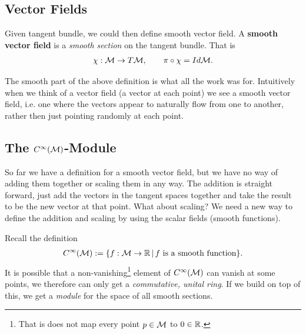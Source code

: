 \documentclass[12pt]{article} %
\begin{document}
\subsection{Vector Fields}
Given tangent bundle, we could then define smooth vector field.
    A \textbf{smooth vector field} is a \textit{smooth section} on the tangent bundle. That is 
    \begin{align*}
        \chi : \mathcal{M}\to T\mathcal{M}, \qquad \pi\circ \chi = Id{\mathcal{M}}.
    \end{align*}
\ed 
\begin{rema}
The smooth part of the above definition is what all the work was for. Intuitively when we think of a vector field (a vector at each point) we see a smooth vector field, i.e. one where the vectors appear to naturally flow from one to another, rather then just pointing randomly at each point.
\end{rema}
\subsection{The $C^{\infty}(\mathcal{M})$-Module}
So far we have a definition for a smooth vector field, but we have no way of adding them together or scaling them in any way. The addition is straight forward, just add the vectors in the tangent spaces together and take the result to be the new vector at that point. What about scaling? We need a new way to define the addition and scaling by using the scalar fields (smooth functions).

 Recall the definition
\begin{align*}
    C^{\infty}(\mathcal{M}) := \{f:\mathcal{M}\to\mathbb{R} \, | \, f \text{ is a smooth function}\}.
\end{align*}
It is possible that a non-vanishing\footnote{That is does not map every point $p\in\mathcal{M}$ to $0\in\mathbb{R}$.} element of $C^{\infty}(\mathcal{M})$ can vanish at some points, we therefore can only get a \textit{commutative, unital ring}. If we build on top of this, we get a \textit{module} for the space of all smooth sections. 
\end{document}
